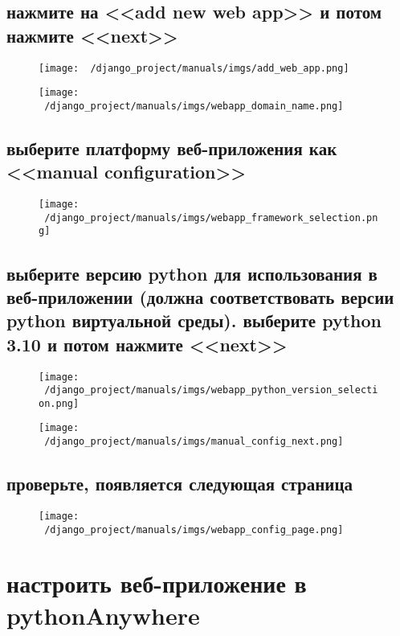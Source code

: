 \documentclass[12pt]{article}
\begin{document}
    \subsection{нажмите на <<add new web app>> и потом нажмите <<next>>}
	\begin{figure}[H]
		\centering
		\texttt{[image: ~/django\_project/manuals/imgs/add\_web\_app.png]}
		\caption{}
	\end{figure}
	\begin{figure}[H]
		\centering
		\texttt{[image: ~/django\_project/manuals/imgs/webapp\_domain\_name.png]}
		\caption{}
	\end{figure}
  \subsection{выберите платформу веб-приложения как <<manual configuration>>}
	\begin{figure}[H]
		\centering
		\texttt{[image: ~/django\_project/manuals/imgs/webapp\_framework\_selection.png]}
		\caption{}
	\end{figure}
  \subsection{выберите версию python для использования в веб-приложении (должна соответствовать версии python виртуальной среды). выберите python 3.10 и потом нажмите <<next>>}
	\begin{figure}[H]
		\centering
		\texttt{[image: ~/django\_project/manuals/imgs/webapp\_python\_version\_selection.png]}
		\caption{}
	\end{figure}
	\begin{figure}[H]
		\centering
		\texttt{[image: ~/django\_project/manuals/imgs/manual\_config\_next.png]}
		\caption{}
	\end{figure}
  \subsection{проверьте, появляется следующая страница}
	\begin{figure}[H]
		\centering
		\texttt{[image: ~/django\_project/manuals/imgs/webapp\_config\_page.png]}
		\caption{}
	\end{figure}
  \section{настроить веб-приложение в pythonAnywhere}
\end{document}
